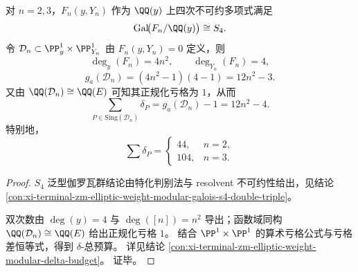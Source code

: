 \begin{theorem}[泛型伽罗瓦群与对应曲线奇点预算的联合刚性]\label{thm:xi-elliptic-weight-modular-galois-delta-joint-rigidity}
对 \(n=2,3\)，\(F_n(y,Y_n)\) 作为 \(\QQ(y)\) 上四次不可约多项式满足
\[
\mathrm{Gal}\!\bigl(F_n/\QQ(y)\bigr)\cong S_4.
\]
令 \(\mathcal D_n\subset \PP^1_y\times\PP^1_{Y_n}\) 由 \(F_n(y,Y_n)=0\) 定义，则
\[
\deg_y(F_n)=4n^2,\qquad \deg_{Y_n}(F_n)=4,
\]
\[
g_a(\mathcal D_n)=(4n^2-1)(4-1)=12n^2-3.
\]
又由 \(\QQ(\mathcal D_n)\cong \QQ(E)\) 可知其正规化亏格为 \(1\)，从而
\[
\sum_{P\in\mathrm{Sing}(\mathcal D_n)}\delta_P
=g_a(\mathcal D_n)-1
=12n^2-4.
\]
特别地，
\[
\sum\delta_P=
\begin{cases}
44,& n=2,\\
104,& n=3.
\end{cases}
\]
\end{theorem}
\begin{proof}
\(S_4\) 泛型伽罗瓦群结论由特化判别法与 resolvent 不可约性给出，见结论
\ref{con:xi-terminal-zm-elliptic-weight-modular-galois-s4-double-triple}。
\par
双次数由 \(\deg(y)=4\) 与 \(\deg([n])=n^2\) 导出；函数域同构
\(
\QQ(\mathcal D_n)\cong \QQ(E)
\)
给出正规化亏格 \(1\)。
结合 \(\PP^1\times\PP^1\) 的算术亏格公式与亏格差恒等式，得到 \(\delta\)-总预算。
详见结论
\ref{con:xi-terminal-zm-elliptic-weight-modular-delta-budget}。
证毕。
\end{proof}

\endinput
